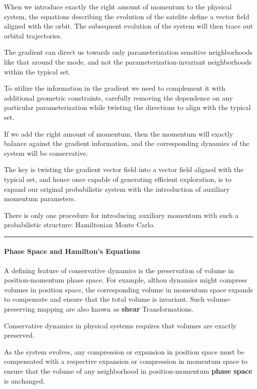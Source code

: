 \documentclass[
]{book}
\begin{document}
When we introduce exactly the right amount of momentum to the physical system, the equations describing the evolution of the satelite define a vector field aligned with the orbit. The subsequent evolution of the system will then trace out orbital trajectories.

The gradient can direct us towards only parameterization sensitive neighborhoods like that around the mode, and not the parameterization-invariant neighborhoods within the typical set.

To utilize the information in the gradient we need to complement it with additional geometric constraints, carefully removing the dependence on any particular parameterization while twisting the directions to align with the typical set.

If we add the right amount of momentum, then the momentum will exactly balance against the gradient information, and the corresponding dynamics of the system will be conservative.

The key is twisting the gradient vector field into a vector field aligned with the typical set, and hence once capable of generating efficient exploration, is to expand our original probabilistic system with the introduction of auxiliary momentum parameters.

There is only one procedure for introducing auxiliary momentum with such a probabilistic structure: Hamiltonian Monte Carlo.

\begin{center}\rule{0.5\linewidth}{0.5pt}\end{center}

\hypertarget{phase-space-and-hamiltons-equations}{%
\paragraph{Phase Space and Hamilton's Equations}\label{phase-space-and-hamiltons-equations}}

A defining feature of conservative dynamics is the preservation of volume in position-momentum phase space. For example, althou dynamics might compress volumes in position space, the corresponding volume in momentum space expands to compensate and ensure that the total volume is invariant. Such volume-preserving mapping are also known as \textbf{shear} Transformations.

Conservative dynamics in physical systems requires that volumes are exactly preserved.

As the system evolves, any compression or expansion in position space must be compensated with a respective expansion or compression in momentum space to ensure that the volume of any neighborhood in position-momentum \textbf{phase space} is unchanged.
\end{document}

